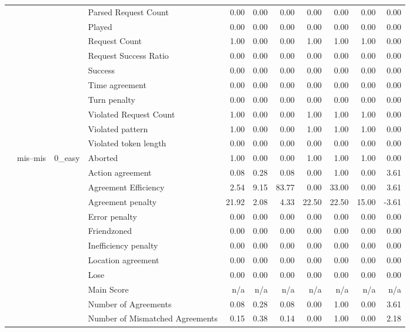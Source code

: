 \begin{tabular}{llllrrrrrrr}
 &  &  & Parsed Request Count & 0.00 & 0.00 & 0.00 & 0.00 & 0.00 & 0.00 & 0.00 \\
 &  &  & Played & 0.00 & 0.00 & 0.00 & 0.00 & 0.00 & 0.00 & 0.00 \\
 &  &  & Request Count & 1.00 & 0.00 & 0.00 & 1.00 & 1.00 & 1.00 & 0.00 \\
 &  &  & Request Success Ratio & 0.00 & 0.00 & 0.00 & 0.00 & 0.00 & 0.00 & 0.00 \\
 &  &  & Success & 0.00 & 0.00 & 0.00 & 0.00 & 0.00 & 0.00 & 0.00 \\
 &  &  & Time agreement & 0.00 & 0.00 & 0.00 & 0.00 & 0.00 & 0.00 & 0.00 \\
 &  &  & Turn penalty & 0.00 & 0.00 & 0.00 & 0.00 & 0.00 & 0.00 & 0.00 \\
 &  &  & Violated Request Count & 1.00 & 0.00 & 0.00 & 1.00 & 1.00 & 1.00 & 0.00 \\
 &  &  & Violated pattern & 1.00 & 0.00 & 0.00 & 1.00 & 1.00 & 1.00 & 0.00 \\
 &  &  & Violated token length & 0.00 & 0.00 & 0.00 & 0.00 & 0.00 & 0.00 & 0.00 \\
\cline{2-11} \cline{3-11}
 & \multirow[t]{216}{*}{mis--mis} & \multirow[t]{27}{*}{0_easy} & Aborted & 1.00 & 0.00 & 0.00 & 1.00 & 1.00 & 1.00 & 0.00 \\
 &  &  & Action agreement & 0.08 & 0.28 & 0.08 & 0.00 & 1.00 & 0.00 & 3.61 \\
 &  &  & Agreement Efficiency & 2.54 & 9.15 & 83.77 & 0.00 & 33.00 & 0.00 & 3.61 \\
 &  &  & Agreement penalty & 21.92 & 2.08 & 4.33 & 22.50 & 22.50 & 15.00 & -3.61 \\
 &  &  & Error penalty & 0.00 & 0.00 & 0.00 & 0.00 & 0.00 & 0.00 & 0.00 \\
 &  &  & Friendzoned & 0.00 & 0.00 & 0.00 & 0.00 & 0.00 & 0.00 & 0.00 \\
 &  &  & Inefficiency penalty & 0.00 & 0.00 & 0.00 & 0.00 & 0.00 & 0.00 & 0.00 \\
 &  &  & Location agreement & 0.00 & 0.00 & 0.00 & 0.00 & 0.00 & 0.00 & 0.00 \\
 &  &  & Lose & 0.00 & 0.00 & 0.00 & 0.00 & 0.00 & 0.00 & 0.00 \\
 &  &  & Main Score & n/a & n/a & n/a & n/a & n/a & n/a & n/a \\
 &  &  & Number of Agreements & 0.08 & 0.28 & 0.08 & 0.00 & 1.00 & 0.00 & 3.61 \\
 &  &  & Number of Mismatched Agreements & 0.15 & 0.38 & 0.14 & 0.00 & 1.00 & 0.00 & 2.18 \\

\end{tabular}
